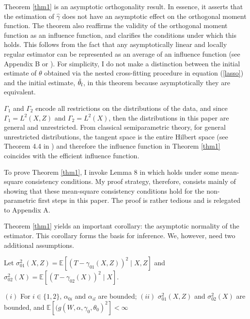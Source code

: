 Theorem \ref{thm1} is an asymptotic orthogonality result. In essence, it asserts that the estimation of $\hat{\gamma}$ does not have an asymptotic effect on the orthogonal moment function. The theorem also reaffirms the validity of the orthogonal moment function as an influence function, and clarifies the conditions under which this holds. This follows from the fact that any asymptotically linear and locally regular estimator can be represented as an average of an influence function (see Appendix B or \citet{kosorok2008introduction}). For simplicity, I do not make a distinction between the initial estimate of $\theta$ obtained via the nested cross-fitting procedure in equation (\ref{lasso}) and the initial estimate, $\Tilde{\theta}_l$, in this theorem because asymptotically they are equivalent.

$\Gamma_1$ and $\Gamma_2$ encode all restrictions on the distributions of the data, and since $\Gamma_1=L^2(X,Z)$ and $\Gamma_2=L^2(X)$, then the distributions in this paper are general and unrestricted. From classical semiparametric theory, for general unrestricted distributions, the tangent space is the entire Hilbert space (see Theorem 4.4 in \citet{tsiatis2006semiparametric}) and therefore the influence function in Theorem \ref{thm1} coincides with the efficient influence function. 

To prove Theorem \ref{thm1}, I invoke Lemma 8 in \citet{chernozhukov2022locally} which holds under some mean-square consistency conditions. My proof strategy, therefore, consists mainly of showing that these mean-square consistency conditions hold for the non-parametric first steps in this paper. The proof is rather tedious and is relegated to Appendix A.

Theorem \ref{thm1} yields an important corollary: the asymptotic normality of the estimator. This corollary forms the basis for inference. We, however, need two additional assumptions. 

Let $\sigma_{01}^2(X,Z)=\mathbb{E}\left[\left(T-\gamma_{01}(X,Z)\right)^2 \mid X, Z \right]$ and $\sigma_{02}^2(X)=\mathbb{E}\left[\left(T-\gamma_{02}(X)\right)^2 \mid X \right]$. 
\begin{assumption} [Boundedness] \label{ass3}
$(i)$ For $i \in \{1,2\}$, $\alpha_{0 i}$ and $\alpha_{i l}$ are bounded; $(ii)$ $\sigma_{01}^2(X,Z)$ and $\sigma_{02}^2(X)$ are bounded, and $\mathbb{E}[(g(W, \alpha,\gamma_0, \theta_0)^2] < \infty$
\end{assumption}  

